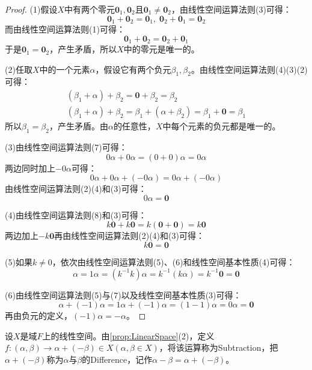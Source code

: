 \begin{proof}
	(1)假设$X$中有两个零元$\mathbf{0}_1,\mathbf{0}_2$且$\mathbf{0}_1\ne\mathbf{0}_2$，由线性空间运算法则(3)可得：
	\begin{equation*}
		\mathbf{0}_1+\mathbf{0}_2=\mathbf{0}_1,\;\mathbf{0}_2+\mathbf{0}_1=\mathbf{0}_2
	\end{equation*}
	而由线性空间运算法则(1)可得：
	\begin{equation*}
		\mathbf{0}_1+\mathbf{0}_2=\mathbf{0}_2+\mathbf{0}_1
	\end{equation*}
	于是$\mathbf{0}_1=\mathbf{0}_2$，产生矛盾，所以$X$中的零元是唯一的。\par
	(2)任取$X$中的一个元素$\alpha$，假设它有两个负元$\beta_1,\beta_2$。由线性空间运算法则(4)(3)(2)可得：
	\begin{gather*}
		(\beta_1+\alpha)+\beta_2=\mathbf{0}+\beta_2=\beta_2 \\
		(\beta_1+\alpha)+\beta_2=\beta_1+(\alpha+\beta_2)=\beta_1+\mathbf{0}=\beta_1
	\end{gather*}
	所以$\beta_1=\beta_2$，产生矛盾。由$\alpha$的任意性，$X$中每个元素的负元都是唯一的。\par
	(3)由线性空间运算法则(7)可得：
	\begin{equation*}
		0\alpha+0\alpha=(0+0)\alpha=0\alpha
	\end{equation*}
	两边同时加上$-0\alpha$可得：
	\begin{equation*}
		0\alpha+0\alpha+(-0\alpha)=0\alpha+(-0\alpha)
	\end{equation*}
	由线性空间运算法则(2)(4)和(3)可得：
	\begin{equation*}
		0\alpha=\mathbf{0}
	\end{equation*}\par
	(4)由线性空间运算法则(8)和(3)可得：
	\begin{equation*}
		k\mathbf{0}+k\mathbf{0}=k(\mathbf{0}+\mathbf{0})=k\mathbf{0}
	\end{equation*}
	两边加上$-k\mathbf{0}$再由线性空间运算法则(2)(4)和(3)可得：
	\begin{equation*}
		k\mathbf{0}=\mathbf{0}
	\end{equation*}\par
	(5)如果$k\ne0$，依次由线性空间运算法则(5)、(6)和线性空间基本性质(4)可得：
	\begin{equation*}
		\alpha=1\alpha=(k^{-1}k)\alpha=k^{-1}(k\alpha)=k^{-1}\mathbf{0}=\mathbf{0}
	\end{equation*}\par
	(6)由线性空间运算法则(5)与(7)以及线性空间基本性质(3)可得：
	\begin{equation*}
		\alpha+(-1)\alpha=1\alpha+(-1)\alpha=(1-1)\alpha=0\alpha=\mathbf{0}
	\end{equation*}
	再由负元的定义，$(-1)\alpha=-\alpha$。
\end{proof}
\begin{definition}
	设$X$是域$F$上的线性空间。由\cref{prop:LinearSpace}(2)，定义$f:(\alpha,\beta)\rightarrow\alpha+(-\beta)\in X(\alpha,\beta\in X)$，将该运算称为\gls{Subtraction}，把$\alpha+(-\beta)$称为$\alpha$与$\beta$的\gls{Difference}，记作$\alpha-\beta=\alpha+(-\beta)$。
\end{definition}

